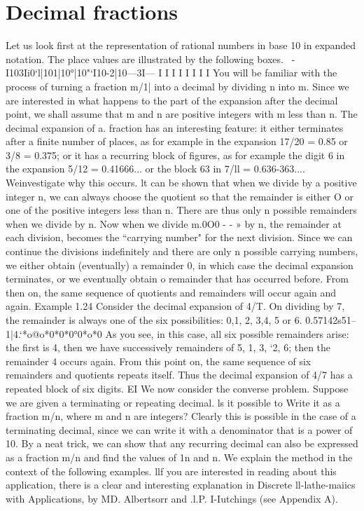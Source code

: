 \section{ Decimal fractions}
Let us look first at the representation of rational numbers in base 10 in expanded notation. The
place values are illustrated by the following boxes.
~-I103Ii0‘l|101|10°|10"‘I10-2|10—3I---
I I I I I I I I
You will be familiar with the process of turning a fraction m/1| into a decimal by dividing n into
m. Since we are interested in what happens to the part of the expansion after the decimal point,
we shall assume that m and n are positive integers with m less than n.
The decimal expansion of a. fraction has an interesting feature: it either terminates after a ﬁnite
number of places, as for example in the expansion 17/20 = 0.85 or 3/8 = 0.375; or it has a recurring
block of ﬁgures, as for example the digit 6 in the expansion 5/12 = 0.41666... or the block 63 in
7/ll = 0.636-363.... Weinvestigate why this occurs.
lt can be shown that when we divide by a positive integer n, we can always choose the quotient
so that the remainder is either O or one of the positive integers less than n. There are thus only
n possible remainders when we divide by n. Now when we divide m.0O0 - - » by n, the remainder
at each division, becomes the “carrying number" for the next division. Since we can continue the
divisions indeﬁnitely and there are only n possible carrying numbers, we either obtain (eventually)
a remainder 0, in which case the decimal expansion terminates, or we eventually obtain o remainder
that has occurred before. From then on, the same sequence of quotients and remainders will occur
again and again.
Example 1.24 Consider the decimal expansion of 4/T. On dividing by 7, the remainder is always
one of the six possibilities: 0,1, 2, 3,4, 5 or 6.
0.57142s51--
1|4.‘*o@o*0*0*0°0*o*0
As you see, in this case, all six possible remainders arise: the ﬁrst is 4, then we have successively
remainders of 5, 1, 3, ‘2, 6; then the remainder 4 occurs again. From this point on, the same sequence
of six remainders and quotients repeats itself. Thus the decimal expansion of 4/7 has a repeated
block of six digits. EI
We now consider the converse problem. Suppose we are given a terminating or repeating decimal.
ls it possible to Write it as a fraction m/n, where m and n are integers? Clearly this is possible in
the case of a terminating decimal, since we can write it with a denominator that is a power of 10.
By a neat trick, we can show that any recurring decimal can also be expressed as a fraction m/n
and ﬁnd the values of 1n and n. We explain the method in the context of the following examples.
llf you are interested in reading about this application, there is a clear and interesting explanation in Discrete
ll-lathe-maiics with Applications, by MD. Albertsorr and .l.P. I-Iutchings (see Appendix A).

